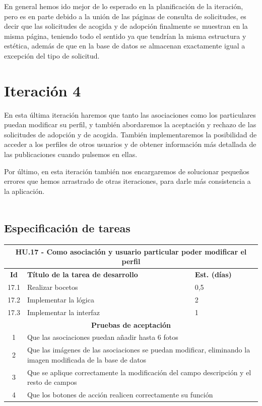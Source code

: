\pagebreak

En general hemos ido mejor de lo esperado en la planificación de la iteración, pero es en parte debido a la unión de las páginas de consulta de solicitudes, es decir que las solicitudes de acogida y de adopción finalmente se muestran en la misma página, teniendo todo el sentido ya que tendrían la misma estructura y estética, además de que en la base de datos se almacenan exactamente igual a excepción del tipo de solicitud. 

\section{Iteración 4}

En esta última iteración haremos que tanto las asociaciones como los particulares puedan modificar su perfil, y también abordaremos la aceptación y rechazo de las solicitudes de adopción y de acogida. También implementaremos la posibilidad de acceder a los perfiles de otros usuarios y de obtener información más detallada de las publicaciones cuando pulsemos en ellas.

Por último, en esta iteración también nos encargaremos de solucionar pequeños errores que hemos arrastrado de otras iteraciones, para darle más consistencia a la aplicación. \\ \\

\subsection{Especificación de tareas}

\begin{tabular}{|c|p{9.5cm}|p{1cm}|}
	\hline
	\multicolumn{3}{|p{10.5cm}|}{\textbf{HU.17 - Como asociación y usuario particular poder modificar el perfil}} \\
	\hline
	\textbf{Id} & \textbf{Título de la tarea de desarrollo} & \textbf{Est. (días)} \\
	\hline
	17.1 & Realizar bocetos & 0,5 \\ \hline
	17.2 &  Implementar la lógica & 2 \\ \hline
	17.3 &  Implementar la interfaz & 1 \\ \hline
	\multicolumn{3}{|c|}{\textbf{Pruebas de aceptación}} \\ \hline
	1 & \multicolumn{2}{|p{12cm}|}{Que las asociaciones puedan añadir hasta 6 fotos} \\ \hline
	2 & \multicolumn{2}{|p{12cm}|}{Que las imágenes de las asociaciones se puedan modificar, eliminando la imagen modificada de la base de datos} \\ \hline
	3 & \multicolumn{2}{|p{12cm}|}{Que se aplique correctamente la modificación del campo descripción y el resto de campos} \\ \hline
	4 & \multicolumn{2}{|p{12cm}|}{Que los botones de acción realicen correctamente su función} \\ \hline
	
\end{tabular} \\ \\

